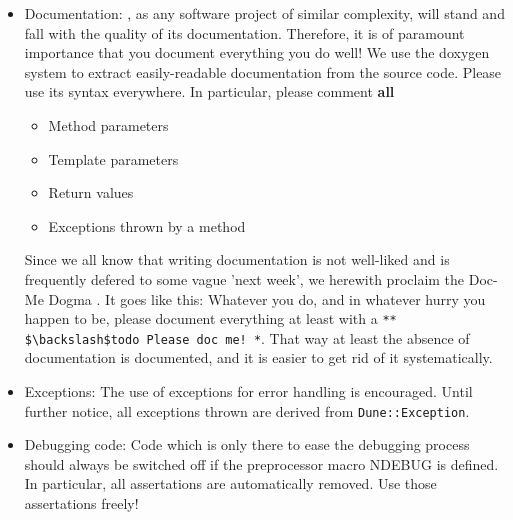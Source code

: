 \begin{itemize}
\item Documentation: \eWoms, as any software project of similar
  complexity, will stand and fall with the quality of its
  documentation.  Therefore, it is of paramount importance that you
  document everything you do well! We use the doxygen system to
  extract easily-readable documentation from the source code. Please
  use its syntax everywhere. In particular, please comment
  \textbf{all}
\begin{itemize}
\item Method parameters
\item Template parameters
\item Return values 
\item Exceptions thrown by a method
 \end{itemize}
 Since we all know that writing documentation is not well-liked and is
 frequently defered to some vague 'next week', we herewith proclaim
 the Doc-Me Dogma . It goes like this: Whatever you do, and in
 whatever hurry you happen to be, please document everything at least
 with a {\verb /** $\backslash$todo Please doc me! */}. That way at
 least the absence of documentation is documented, and it is easier to
 get rid of it systematically.
\item Exceptions: The use of exceptions for error handling is
  encouraged. Until further notice, all exceptions thrown are derived
  from \texttt{Dune::Exception}.
\item Debugging code: Code which is only there to ease the debugging
  process should always be switched off if the preprocessor macro
  NDEBUG is defined. In particular, all assertations are automatically
  removed. Use those assertations freely!
\end{itemize}

